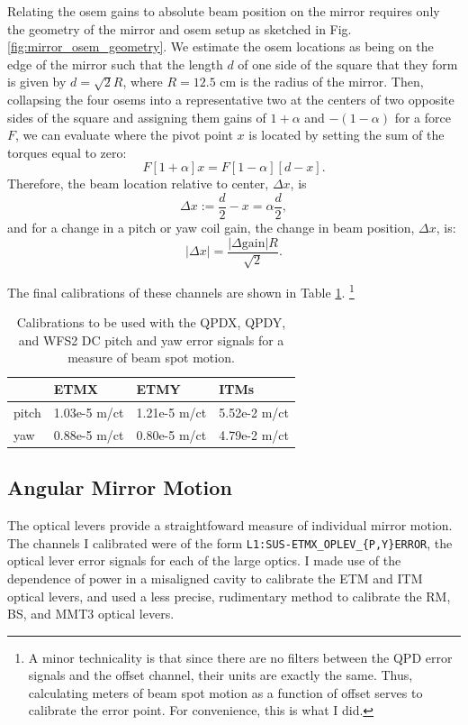 Relating the osem gains to absolute beam position on the mirror
requires only the geometry of the mirror and osem setup as sketched in
Fig. \ref{fig:mirror_osem_geometry}. We estimate the osem locations as
being on the edge of the mirror such that the length $d$ of one side
of the square that they form is given by $d =\sqrt{2} R$, where $R =
12.5$ cm is the radius of the mirror. Then, collapsing the four osems
into a representative two at the centers of two opposite sides of the
square and assigning them gains of $1 + \alpha$ and $-(1-\alpha)$ for
a force $F$, we can evaluate where the pivot point $x$ is located by
setting the sum of the torques equal to zero:
\begin{equation}
F [1+\alpha] x = F [1-\alpha][d-x].
\end{equation}
Therefore, the beam location relative to center, $\Delta x$, is
\begin{equation}
\Delta x := \frac{d}{2} - x = \alpha \frac{d}{2},
\end{equation}
and for a change in a pitch or yaw coil gain, the change in beam
position, $\Delta x$, is:
\begin{equation}
|\Delta{x}| = \frac{|\Delta{\mbox{gain}}| R}{\sqrt{2}} .
\end{equation}

The final calibrations of these channels are shown in Table
\ref{table:bsmcal}. \footnote{A minor technicality is that since there
  are no filters between the QPD error signals and the offset channel,
  their units are exactly the same. Thus, calculating meters of beam
  spot motion as a function of offset serves to calibrate the error
  point. For convenience, this is what I did.}

\begin{table}
\centering
\caption[Beam spot motion calibrations]{Calibrations to be used with
 the QPDX, QPDY, and WFS2 DC pitch and yaw error signals for a
 measure of beam spot motion.} 
\begin{tabular}{l l l l}
\hline
         & ETMX & ETMY & ITMs \\
\hline
pitch & 1.03e-5 m/ct & 1.21e-5 m/ct & 5.52e-2 m/ct \\
yaw & 0.88e-5 m/ct & 0.80e-5 m/ct & 4.79e-2 m/ct \\
\hline
\end{tabular}
\label{table:bsmcal}
\end{table}



\subsection{Angular Mirror Motion}
The optical levers provide a straightfoward measure of individual
mirror motion. The channels I calibrated were of the form
\texttt{L1:SUS-ETMX\_OPLEV\_\{P,Y\}ERROR}, the optical lever error
signals for each of the large optics. I made use of the dependence of
power in a misaligned cavity to calibrate the ETM and ITM optical
levers, and used a less precise, rudimentary method to calibrate the
RM, BS, and MMT3 optical levers.


